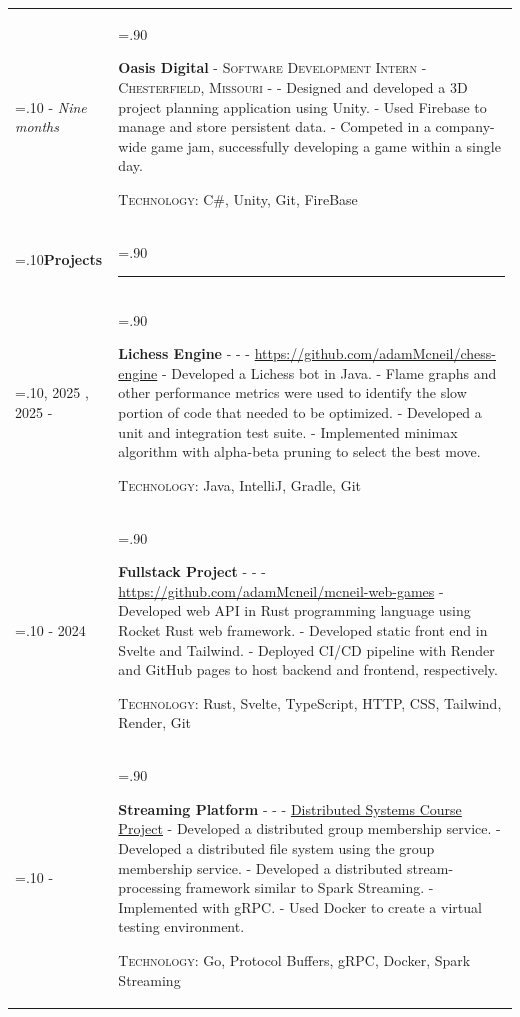 \documentclass[10pt]{article}
\newcommand{\timeFrame}[3] {
  \if\relax\detokenize{#2}\relax
    #1
  \else
    #1 - #2
  \fi
  \newline
  \scriptsize \textit{#3}
}
\newcommand{\entry}[6] {
  \textbf{#1}
  \if\relax\detokenize{#2}\relax
  \else
       - \textsc{#2}
  \fi
  \if\relax\detokenize{#3}\relax
  \else
      - \textsc{#3}
  \fi
  \if\relax\detokenize{#4}\relax
  \else
      - \href{https://#4}{#4}
  \fi
  \newline #5
  \if\relax\detokenize{#6}\relax
  \else
      \newline \textsc{Technology:} #6
  \fi
  \\
}
\newcommand{\horizontalLine}[0] {
    \noindent\rule{.90\linewidth}{0.4pt}
}
\begin{document}
\begin{tabularx}{\linewidth}{>{\hsize=.10\hsize}X>{\hsize=.90\hsize}X}
\timeFrame{2022}{}{Nine months} &
\entry{Oasis Digital}
  {Software Development Intern}
  {Chesterfield, Missouri}
  {}
  {
  - Designed and developed a 3D project planning application using Unity. \newline
  - Used Firebase to manage and store persistent data. \newline
  - Competed in a company-wide game jam, successfully developing a game within a single day.
  }
  {C\#, Unity, Git, FireBase}


\textbf{Projects} & \horizontalLine \\
\timeFrame{2021, 2025}{}{} &
\entry{Lichess Engine}
  {}
  {}
  {https://github.com/adamMcneil/chess-engine}
  {
    - Developed a Lichess bot in Java. \newline
    - Flame graphs and other performance metrics were used to identify the slow portion of code that needed to be optimized. \newline
    - Developed a unit and integration test suite. \newline
    - Implemented minimax algorithm with alpha-beta pruning to select the best move.
  }
  {Java, IntelliJ, Gradle, Git}


\timeFrame{2023}{2024}{} &
\entry{Fullstack Project}
  {}
  {}
  {https://github.com/adamMcneil/mcneil-web-games}
  {
  - Developed web API in Rust programming language using Rocket Rust web framework. \newline
  - Developed static front end in Svelte and Tailwind. \newline
  - Deployed CI/CD pipeline with Render and GitHub pages to host backend and frontend, respectively.
  }
  {Rust, Svelte, TypeScript, HTTP, CSS, Tailwind, Render, Git
  }

\timeFrame{2024}{}{} &
\entry{Streaming Platform}
  {}
  {}
  {Distributed Systems Course Project}
  {
  - Developed a distributed group membership service. \newline
  - Developed a distributed file system using the group membership service. \newline
  - Developed a distributed stream-processing framework similar to Spark Streaming. \newline
  - Implemented with gRPC. \newline
  - Used Docker to create a virtual testing environment.
  }
  {Go, Protocol Buffers, gRPC, Docker, Spark Streaming
  }




\end{tabularx}
\end{document}
